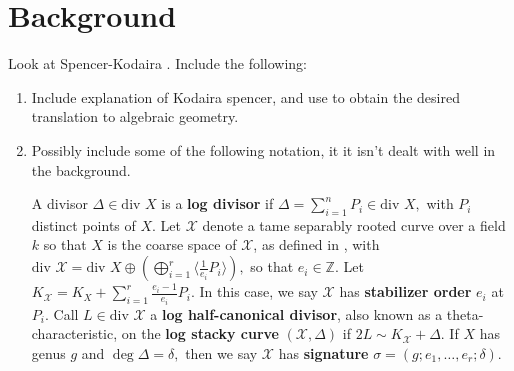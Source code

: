 \documentclass{amsart}
\theoremstyle{plain}
\theoremstyle{definition}
\theoremstyle{remark}
\numberwithin{equation}{section}
\newcommand\BZ{{\mathbb Z}}
\newcommand \sx{\mathscr X}
\newcommand \di{\text{div }}
\newcommand \halfcan{L}
\begin{document}
\section{Background}
\label{sec:background}
Look at Spencer-Kodaira \cite{kodaira:complex-manifolds}.
Include the following:
\begin{enumerate}
	\item Include explanation of Kodaira spencer, and use \cite[Lemma 10.2.1]{vzb:stacky} to obtain the desired translation to algebraic geometry.
	\item Possibly include some of the following notation, it it isn't dealt with well in the background.
	
 A divisor $\Delta \in \di X$ is a {\bf log divisor} if
$\Delta = \sum_{i=1}^{n}P_i \in \di X,$ with $P_i$ distinct points of $X$.  Let
$\sx$ denote a tame separably rooted curve over a
field $k$ so that $X$ is the coarse space of $\sx$, as defined in
\cite[Section 5.2]{vzb:stacky}, with $\di \sx = \di X \oplus \left(\bigoplus_{i
= 1}^r \langle \frac{1}{e_i}P_i \rangle \right),$ so that $e_i \in \BZ$. Let $K_
\sx = K_X + \sum_{i = 1}^{r}\frac{e_i - 1}{e_i}P_i.$ In this case, we
say $\sx$ has {\bf stabilizer order} $e_i$ at $P_i$. Call $\halfcan
\in \di \sx$ a {\bf log half-canonical divisor}, also known as a theta-characteristic, on the {\bf log stacky curve} $(\sx,\Delta)$ if
$2\halfcan \sim K_\sx + \Delta$. If $X$ has genus $g$ and $\deg \Delta =\delta,$ then we
say $\sx$ has \textbf{signature} $\sigma = (g; e_1, \ldots, e_r; \delta)$. 


\end{enumerate}
\end{document}
